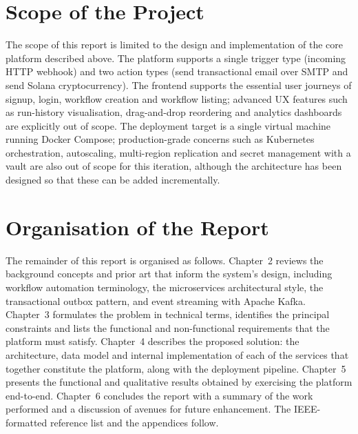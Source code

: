 \section{Scope of the Project}

The scope of this report is limited to the design and implementation of the core platform described above. The platform supports a single trigger type (incoming HTTP webhook) and two action types (send transactional email over SMTP and send Solana cryptocurrency). The frontend supports the essential user journeys of signup, login, workflow creation and workflow listing; advanced UX features such as run-history visualisation, drag-and-drop reordering and analytics dashboards are explicitly out of scope. The deployment target is a single virtual machine running Docker Compose; production-grade concerns such as Kubernetes orchestration, autoscaling, multi-region replication and secret management with a vault are also out of scope for this iteration, although the architecture has been designed so that these can be added incrementally.

\section{Organisation of the Report}

The remainder of this report is organised as follows. Chapter~2 reviews the background concepts and prior art that inform the system's design, including workflow automation terminology, the microservices architectural style, the transactional outbox pattern, and event streaming with Apache Kafka. Chapter~3 formulates the problem in technical terms, identifies the principal constraints and lists the functional and non-functional requirements that the platform must satisfy. Chapter~4 describes the proposed solution: the architecture, data model and internal implementation of each of the services that together constitute the platform, along with the deployment pipeline. Chapter~5 presents the functional and qualitative results obtained by exercising the platform end-to-end. Chapter~6 concludes the report with a summary of the work performed and a discussion of avenues for future enhancement. The IEEE-formatted reference list and the appendices follow.
